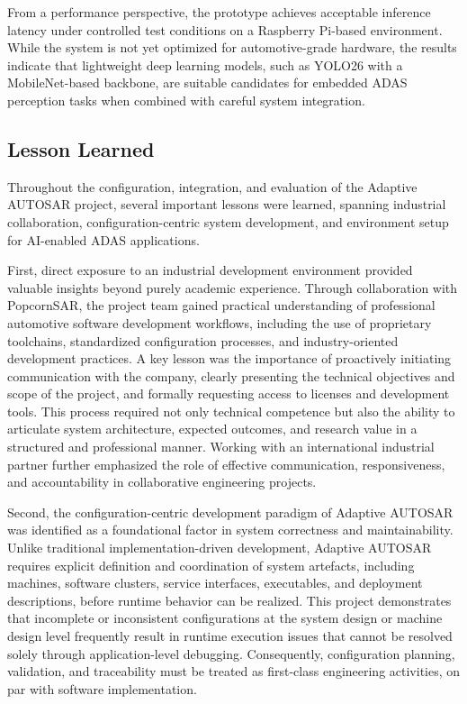 From a performance perspective, the prototype achieves acceptable inference latency under controlled test conditions on a Raspberry Pi-based environment. While the system is not yet optimized for automotive-grade hardware, the results indicate that lightweight deep learning models, such as YOLO26 with a MobileNet-based backbone, are suitable candidates for embedded ADAS perception tasks when combined with careful system integration.

\subsection{Lesson Learned}

Throughout the configuration, integration, and evaluation of the Adaptive AUTOSAR project, several important lessons were learned, spanning industrial collaboration, configuration-centric system development, and environment setup for AI-enabled ADAS applications.

First, direct exposure to an industrial development environment provided valuable insights beyond purely academic experience. Through collaboration with PopcornSAR, the project team gained practical understanding of professional automotive software development workflows, including the use of proprietary toolchains, standardized configuration processes, and industry-oriented development practices. A key lesson was the importance of proactively initiating communication with the company, clearly presenting the technical objectives and scope of the project, and formally requesting access to licenses and development tools. This process required not only technical competence but also the ability to articulate system architecture, expected outcomes, and research value in a structured and professional manner. Working with an international industrial partner further emphasized the role of effective communication, responsiveness, and accountability in collaborative engineering projects.

Second, the configuration-centric development paradigm of Adaptive AUTOSAR was identified as a foundational factor in system correctness and maintainability. Unlike traditional implementation-driven development, Adaptive AUTOSAR requires explicit definition and coordination of system artefacts, including machines, software clusters, service interfaces, executables, and deployment descriptions, before runtime behavior can be realized. This project demonstrates that incomplete or inconsistent configurations at the system design or machine design level frequently result in runtime execution issues that cannot be resolved solely through application-level debugging. Consequently, configuration planning, validation, and traceability must be treated as first-class engineering activities, on par with software implementation.

